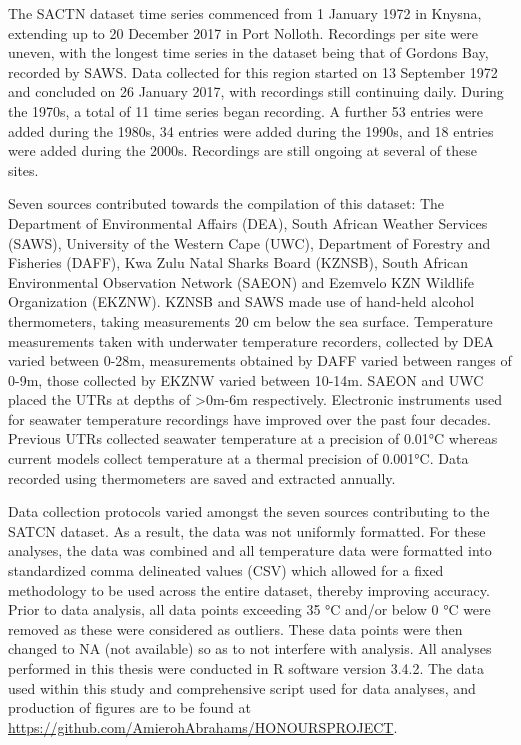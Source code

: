 \documentclass[12pt,A4paper,]{article}
\begin{document}
The SACTN dataset time series commenced from 1 January 1972 in Knysna,
extending up to 20 December 2017 in Port Nolloth. Recordings per site
were uneven, with the longest time series in the dataset being that of
Gordons Bay, recorded by SAWS. Data collected for this region started on
13 September 1972 and concluded on 26 January 2017, with recordings
still continuing daily. During the 1970s, a total of 11 time series
began recording. A further 53 entries were added during the 1980s, 34
entries were added during the 1990s, and 18 entries were added during
the 2000s. Recordings are still ongoing at several of these sites.

Seven sources contributed towards the compilation of this dataset: The
Department of Environmental Affairs (DEA), South African Weather
Services (SAWS), University of the Western Cape (UWC), Department of
Forestry and Fisheries (DAFF), Kwa Zulu Natal Sharks Board (KZNSB),
South African Environmental Observation Network (SAEON) and Ezemvelo KZN
Wildlife Organization (EKZNW). KZNSB and SAWS made use of hand-held
alcohol thermometers, taking measurements 20 cm below the sea surface.
Temperature measurements taken with underwater temperature recorders,
collected by DEA varied between 0-28m, measurements obtained by DAFF
varied between ranges of 0-9m, those collected by EKZNW varied between
10-14m. SAEON and UWC placed the UTRs at depths of \textgreater{}0m-6m
respectively. Electronic instruments used for seawater temperature
recordings have improved over the past four decades. Previous UTRs
collected seawater temperature at a precision of 0.01°C whereas current
models collect temperature at a thermal precision of 0.001°C. Data
recorded using thermometers are saved and extracted annually.

Data collection protocols varied amongst the seven sources contributing
to the SATCN dataset. As a result, the data was not uniformly formatted.
For these analyses, the data was combined and all temperature data were
formatted into standardized comma delineated values (CSV) which allowed
for a fixed methodology to be used across the entire dataset, thereby
improving accuracy. Prior to data analysis, all data points exceeding 35
°C and/or below 0 °C were removed as these were considered as outliers.
These data points were then changed to NA (not available) so as to not
interfere with analysis. All analyses performed in this thesis were
conducted in R software version 3.4.2. The data used within this study
and comprehensive script used for data analyses, and production of
figures are to be found at
\url{https://github.com/AmierohAbrahams/HONOURSPROJECT}.
\end{document}

